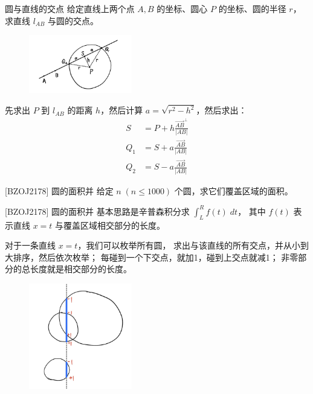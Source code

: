\documentclass{beamer}
\begin{document}
\begin{frame}{圆与直线的交点}
    \footnotesize
    给定直线上两个点 $A,B$ 的坐标、圆心 $P$ 的坐标、圆的半径 $r$，
    求直线 $l_{AB}$ 与圆的交点。

    \vspace{1em}\pause
    \begin{figure}[H]
        \centering
        \includegraphics[width=0.4\textwidth]{pic/lineIcircle.jpg}
    \end{figure}
    先求出 $P$ 到 $l_{AB}$ 的距离 $h$，然后计算 $a=\sqrt{r^2-h^2}$，然后求出：
    \begin{align}
        S &= P+h \frac{\overrightarrow{AB}^\perp}{|AB|}\\
        Q_1 &= S + a \frac{\overrightarrow{AB}}{|AB|}\\
        Q_2 &= S - a \frac{\overrightarrow{AB}}{|AB|}
    \end{align}
\end{frame}

\begin{frame}{[BZOJ2178] 圆的面积并}
    给定 $n\;(n\leq 1000)$ 个圆，求它们覆盖区域的面积。
\end{frame}

\begin{frame}{[BZOJ2178] 圆的面积并}
    \footnotesize
    基本思路是辛普森积分求 $\int_L^R f(t)\; dt$，
    其中 $f(t)$ 表示直线 $x=t$ 与覆盖区域相交部分的长度。
    
    \vspace{1em}\pause
    对于一条直线 $x=t$，我们可以枚举所有圆，
    求出与该直线的所有交点，并从小到大排序，然后依次枚举；
    每碰到一个下交点，就加1，碰到上交点就减1；
    非零部分的总长度就是相交部分的长度。

    \begin{figure}[H]
        \centering
        \includegraphics[width=0.4\textwidth]{pic/circleinsec.jpg}
    \end{figure}
\end{frame}
\end{document}

